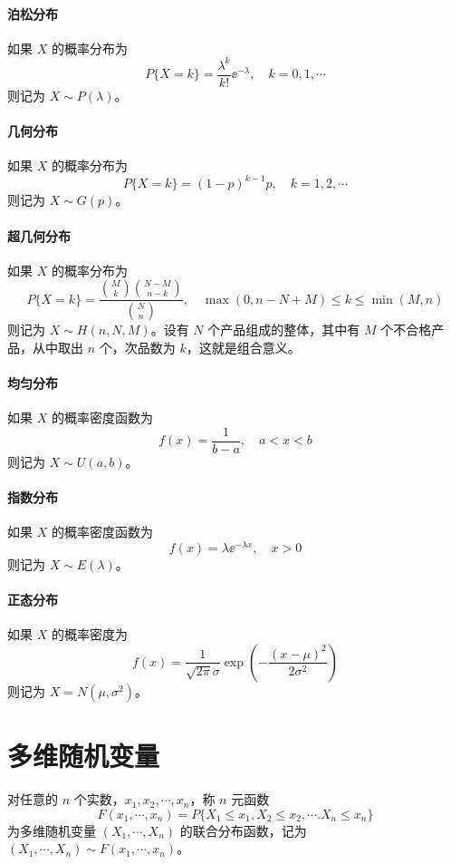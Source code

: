 \paragraph{泊松分布}
如果 $X$ 的概率分布为
\[ P\{X = k\} = \frac{\lambda^k}{k!} \ee^{-\lambda} , \quad k = 0, 1, \cdots \]
则记为 $X \sim P(\lambda)$。

\paragraph{几何分布}
如果 $X$ 的概率分布为
\[ P\{X=k\} = (1 - p)^{k-1}p, \quad k = 1, 2, \cdots \]
则记为 $X \sim G(p)$。

\paragraph{超几何分布}
如果 $X$ 的概率分布为
\[ P\{X = k\} = \frac{\binom{M}{k} \binom{N - M}{n - k}}{\binom{N}{n}}, \quad \max(0, n - N + M) \leqslant k \leqslant \min(M, n) \]
则记为 $X \sim H(n, N, M)$。设有 $N$ 个产品组成的整体，其中有 $M$ 个不合格产品，从中取出 $n$ 个，次品数为 $k$，这就是组合意义。

\paragraph{均匀分布}
如果 $X$ 的概率密度函数为
\[ f(x) = \frac{1}{b - a}, \quad a < x < b \]
则记为 $X \sim U(a, b)$。

\paragraph{指数分布}
如果 $X$ 的概率密度函数为
\[ f(x) = \lambda \ee^{-\lambda x}, \quad x > 0 \]
则记为 $X \sim E(\lambda)$。

\paragraph{正态分布}
如果 $X$ 的概率密度为
\[ f(x) = \frac{1}{\sqrt{2 \pi}  \sigma} \exp \left(- \frac{(x - \mu)^2}{2\sigma^2}  \right) \]
则记为 $X = N(\mu, \sigma^2)$。

\section{多维随机变量}

对任意的 $n$ 个实数，$x_1, x_2, \cdots, x_n$，称 $n$ 元函数
\[ F(x_1, \cdots, x_n) = P\{X_1 \leqslant x_1, X_2 \leqslant x_2, \cdots. X_n \leqslant x_n\} \]
为多维随机变量 $(X_1, \cdots, X_n)$ 的联合分布函数，记为 $(X_1, \cdots, X_n) \sim F(x_1, \cdots, x_n)$。

